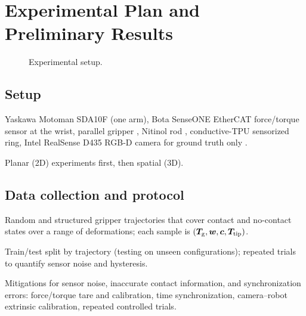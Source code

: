 \section{Experimental Plan and Preliminary Results}
\label{sec:experiments}

\begin{figure}[t]
  \centering
  \caption{Experimental setup.}
  \label{fig:setup}
\end{figure}

\subsection{Setup}
\label{sec:exp:setup}
\begin{outline}
  \item Yaskawa Motoman SDA10F (one arm), Bota SenseONE EtherCAT force/torque
    sensor at the wrist, parallel gripper , Nitinol rod
    , conductive-TPU sensorized ring, Intel RealSense
    D435 RGB-D camera for ground truth only .
  \item Planar (2D) experiments first, then spatial (3D).
\end{outline}

\subsection{Data collection and protocol}
\label{sec:exp:protocol}
\begin{outline}
  \item Random and structured gripper trajectories that cover contact and
    no-contact states over a range of deformations; each sample is
    $(\bm{T}_{\mathrm{g}},\bm{w},\bm{c},\bm{T}_{\mathrm{tip}})$.
  \item Train/test split by trajectory (testing on unseen configurations);
    repeated trials to quantify sensor noise and hysteresis.
  \item Mitigations for sensor noise, inaccurate contact information, and
    synchronization errors: force/torque tare and calibration, time
    synchronization, camera--robot extrinsic calibration, repeated controlled
    trials.
  \item {}
\end{outline}

